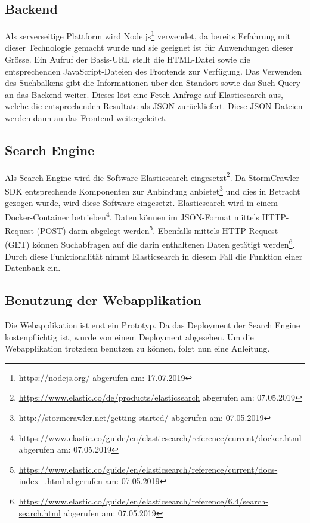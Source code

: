 \subsection{Backend}
Als serverseitige Plattform wird \glqq Node.js\footnote{\url{https://nodejs.org/} abgerufen am: 17.07.2019}\grqq{} verwendet, da bereits Erfahrung mit dieser Technologie gemacht wurde und sie geeignet ist für Anwendungen dieser Grösse.
Ein Aufruf der Basis-URL stellt die HTML-Datei sowie die entsprechenden JavaScript-Dateien des Frontends zur Verfügung.
Das Verwenden des Suchbalkens gibt die Informationen über den Standort sowie das Such-Query an das Backend weiter.
Dieses löst eine Fetch-Anfrage auf Elasticsearch aus, welche die entsprechenden Resultate als JSON zurückliefert.
Diese JSON-Dateien werden dann an das Frontend weitergeleitet.
\subsection{Search Engine}
Als Search Engine wird die Software \glqq Elasticsearch\grqq{} eingesetzt\footnote{\url{https://www.elastic.co/de/products/elasticsearch} abgerufen am: 07.05.2019}.
Da StormCrawler SDK entsprechende Komponenten zur Anbindung anbietet\footnote{\url{http://stormcrawler.net/getting-started/} abgerufen am: 07.05.2019} und dies in Betracht gezogen wurde, wird diese Software eingesetzt.
Elasticsearch wird in einem Docker-Container betrieben\footnote{\url{https://www.elastic.co/guide/en/elasticsearch/reference/current/docker.html} abgerufen am: 07.05.2019}.
Daten können im JSON-Format mittels HTTP-Request (POST) darin abgelegt werden\footnote{\url{https://www.elastic.co/guide/en/elasticsearch/reference/current/docs-index_.html} abgerufen am: 07.05.2019}.
Ebenfalls mittels HTTP-Request (GET) können Suchabfragen auf die darin enthaltenen Daten getätigt werden\footnote{\url{https://www.elastic.co/guide/en/elasticsearch/reference/6.4/search-search.html} abgerufen am: 07.05.2019}.
Durch diese Funktionalität nimmt Elasticsearch in diesem Fall die Funktion einer Datenbank ein.
\subsection{Benutzung der Webapplikation}
Die Webapplikation ist erst ein Prototyp.
Da das Deployment der Search Engine kostenpflichtig ist, wurde von einem Deployment abgesehen.
Um die Webapplikation trotzdem benutzen zu können, folgt nun eine Anleitung.\\

